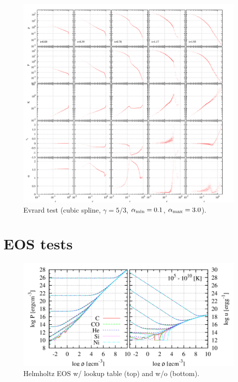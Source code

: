 \documentclass[fleqn,dvipdfmx]{article}
\begin{document}
\begin{figure}
  \begin{center}
    \includegraphics[width=14cm,bb=0 0 2120 2000]{fig/evrard/draw.png}
  \end{center}
  \caption{Evrard test (cubic spline, $\gamma=5/3$, $\alpha_{\rm
      min}=0.1$, $\alpha_{\rm max}=3.0$).}
\end{figure}

\section{EOS tests}

\begin{figure}
  \begin{center}
    \includegraphics[width=14cm,bb=0 0 980 480]{fig/eos/draw.png}
  \end{center}
  \caption{Helmholtz EOS w/ lookup table (top) and w/o (bottom).}
\end{figure}
\end{document}
